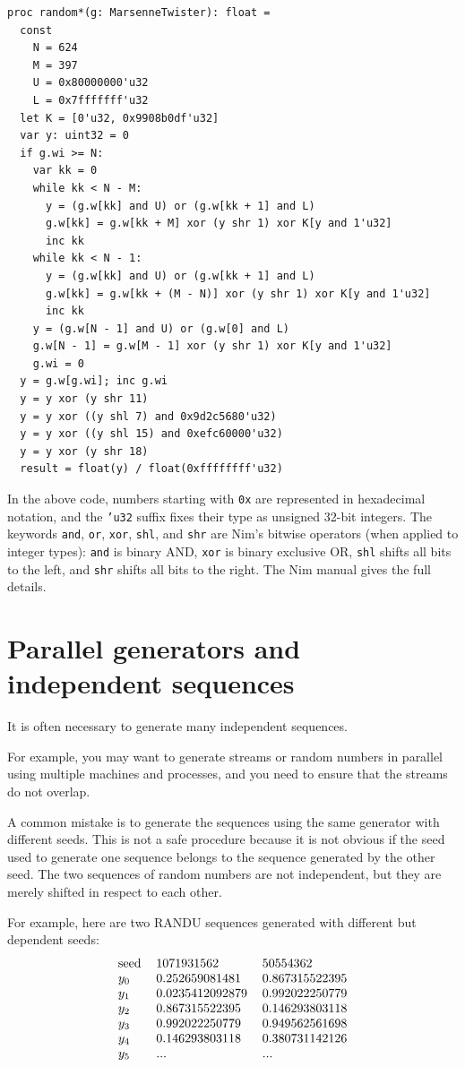 \documentclass[justified, sixbynine]{tufte-book}
\def\ft{\small\tt}
\theoremstyle{plain}%
\newtheorem * {corollary}{Corollary}
\theoremstyle{definition}
\theoremstyle{remark}
\newtheorem * {remark}{Remark}
\newtheorem * {note}{Note}
\begin{document}
\begin{fullwidth}
\begin{lstlisting}[caption={in file: {\ft nlib.nim}}]
proc random*(g: MarsenneTwister): float =
  const
    N = 624
    M = 397
    U = 0x80000000'u32
    L = 0x7fffffff'u32
  let K = [0'u32, 0x9908b0df'u32]
  var y: uint32 = 0
  if g.wi >= N:
    var kk = 0
    while kk < N - M:
      y = (g.w[kk] and U) or (g.w[kk + 1] and L)
      g.w[kk] = g.w[kk + M] xor (y shr 1) xor K[y and 1'u32]
      inc kk
    while kk < N - 1:
      y = (g.w[kk] and U) or (g.w[kk + 1] and L)
      g.w[kk] = g.w[kk + (M - N)] xor (y shr 1) xor K[y and 1'u32]
      inc kk
    y = (g.w[N - 1] and U) or (g.w[0] and L)
    g.w[N - 1] = g.w[M - 1] xor (y shr 1) xor K[y and 1'u32]
    g.wi = 0
  y = g.w[g.wi]; inc g.wi
  y = y xor (y shr 11)
  y = y xor ((y shl 7) and 0x9d2c5680'u32)
  y = y xor ((y shl 15) and 0xefc60000'u32)
  y = y xor (y shr 18)
  result = float(y) / float(0xffffffff'u32)
\end{lstlisting}

In the above code, numbers starting with \verb!0x! are represented in hexadecimal notation, and the {\ft 'u32} suffix fixes their type as unsigned 32-bit integers. The keywords {\ft and}, {\ft or}, {\ft xor}, {\ft shl}, and {\ft shr} are Nim's bitwise operators (when applied to integer types): {\ft and} is binary AND, {\ft xor} is binary exclusive OR, {\ft shl} shifts all bits to the left, and {\ft shr} shifts all bits to the right. The Nim manual gives the full details.

\goodbreak\section{Parallel generators and independent sequences}

It is often necessary to generate many independent sequences.

For example, you may want to generate streams or random numbers in parallel using multiple machines and processes, and you need to ensure that the streams do not overlap.

A common mistake is to generate the sequences using the same
generator with different seeds. This is not a safe procedure because it is
not obvious if the seed used to generate one sequence belongs to the
sequence generated by the other seed. The two
sequences of random numbers are not independent, but they are merely
shifted in respect to each other.

For example, here are two RANDU sequences generated with different but dependent
seeds:
\begin{equation}
\begin{tabular}{lll}
seed & 1071931562 & 50554362 \\
$y_0$ & 0.252659081481 & 0.867315522395 \\
$y_1$ & 0.0235412092879 & 0.992022250779 \\
$y_2$ & 0.867315522395 & 0.146293803118 \\
$y_3$ & 0.992022250779 & 0.949562561698 \\
$y_4$ & 0.146293803118 & 0.380731142126 \\
$y_5$ & ... & ...
\end{tabular}
\end{equation}


\end{fullwidth}
\end{document}
